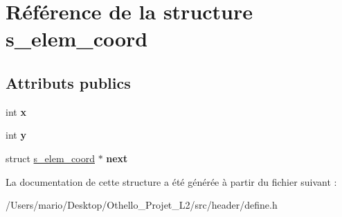 \hypertarget{structs__elem__coord}{}\section{Référence de la structure s\+\_\+elem\+\_\+coord}
\label{structs__elem__coord}
\subsection*{Attributs publics}
\begin{DoxyCompactItemize}
\item 
\mbox{\label{structs__elem__coord_a7d18beac76a18259669a03795285523a}} 
int {\bfseries x}
\item 
\mbox{\label{structs__elem__coord_a4495b868e64f0dc7e9f56c0284cad6ef}} 
int {\bfseries y}
\item 
\mbox{\label{structs__elem__coord_a53b70a7cfbf9d39b9a4d15fc3ead99c2}} 
struct \mbox{\hyperlink{structs__elem__coord}{s\+\_\+elem\+\_\+coord}} $\ast$ {\bfseries next}
\end{DoxyCompactItemize}


La documentation de cette structure a été générée à partir du fichier suivant \+:\begin{DoxyCompactItemize}
\item 
/\+Users/mario/\+Desktop/\+Othello\+\_\+\+Projet\+\_\+\+L2/src/header/define.\+h\end{DoxyCompactItemize}
